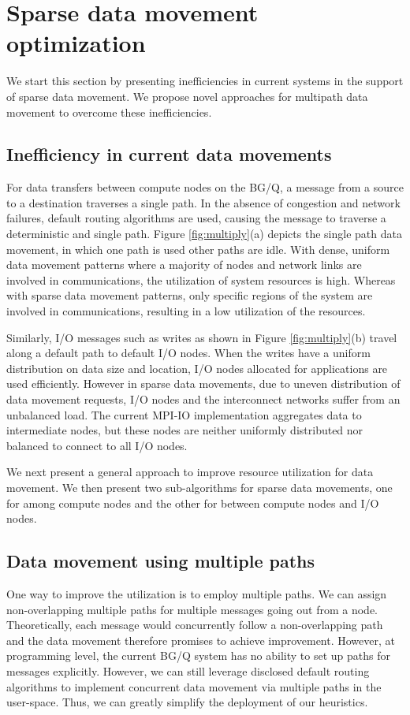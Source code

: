 \section{Sparse data movement optimization}
\label{sec:approaches}
We start this section by presenting inefficiencies in current systems in the support of sparse data movement. We propose novel approaches for multipath data movement to overcome these inefficiencies.

\subsection{Inefficiency in current data movements}
For data transfers between compute nodes on the BG/Q, a message from a source to a destination traverses a single path. In the absence of congestion and network failures, default routing algorithms are used, causing the message to traverse a deterministic and single path. Figure \ref{fig:multiply}(a) depicts the single path data movement, in which one path is used other paths are idle. With dense, uniform data movement patterns where a majority of nodes and network links are involved in communications, the utilization of system resources is high. Whereas with sparse data movement patterns, only specific regions of the system are involved in communications, resulting in a low utilization of the resources.

Similarly, I/O messages such as writes as shown in Figure \ref{fig:multiply}(b) travel along a default path to default I/O nodes. When the writes  have a uniform distribution on data size and location, I/O nodes allocated for applications are used efficiently. However in sparse data movements, due to uneven distribution of data movement requests, I/O nodes and the interconnect networks suffer from an unbalanced load. The current MPI-IO implementation aggregates data to intermediate nodes, but these nodes are neither uniformly distributed nor balanced to connect to all I/O nodes. 

We next present a general approach to improve resource utilization for data movement. We then present two sub-algorithms for sparse data movements, one for among compute nodes and the other for between compute nodes and I/O nodes.

\subsection{Data movement using multiple paths}
One way to improve the utilization is to employ multiple paths. We can assign non-overlapping multiple paths for multiple messages going out from a node. Theoretically, each message would concurrently follow a non-overlapping path and the data movement therefore promises to achieve  improvement. However, at programming level, the current BG/Q system has no ability to set up paths for messages explicitly. However, we can still leverage disclosed default routing algorithms to implement concurrent data movement via multiple paths in the user-space. Thus, we can greatly simplify the deployment of our heuristics.

